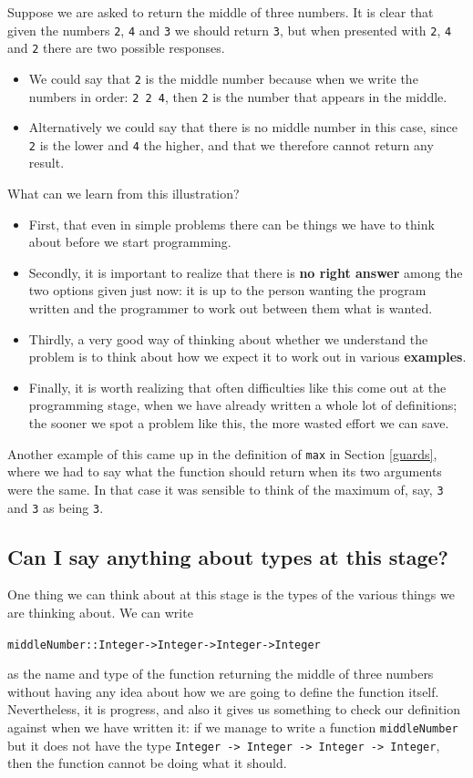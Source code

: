 Suppose we are asked to return the middle of three numbers. It is clear
that given the numbers \texttt{2}, \texttt{4} and
\texttt{3} we should return \texttt{3}, but when presented with \texttt{2}, \texttt{4} and
\texttt{2} there are two possible responses.
\begin{itemize}
\item\label{middleNumb}
We could say that \texttt{2}
is the middle number because when we write the numbers in order: \texttt{2 2 4}, 
then \texttt{2} 
is the number that appears in the middle.
\item
Alternatively we could say that there is no middle number in this case,
since \texttt{2} is the lower and \texttt{4} the higher,
and that we therefore cannot return any result.
\end{itemize}
What can we learn from this illustration? 
\begin{itemize}
\item
First, that even in simple
problems there can be things we have to think about before we start programming.
\item
Secondly, it is important to realize that there is \textbf{no right answer} among the two options 
given just now: it is up to the person wanting the program written and
the programmer to work out between them what is wanted. 
\item
Thirdly, a very
good way of thinking about whether we understand the problem is to think
about how we expect it to work out in various \textbf{examples}.
\item
Finally, it is worth realizing that often difficulties like this come
out at the programming stage, when we have already written a whole lot
of definitions; the sooner we spot a problem like this, the more wasted effort
we can save.
\end{itemize}
Another example of this came up in the definition of \texttt{max}
in Section \ref{guards}, where we had to say what the function should
return when its two arguments were the same. In that case it was
sensible to think of the maximum of, say, 
\texttt{3} and \texttt{3} as being \texttt{3}.

\subsection*{Can I say anything about types at this stage?}

One thing we can think about at this stage is the types of the various
things we are thinking about. We can write
\begin{alltt}
middleNumber :: Integer -> Integer -> Integer -> Integer 
\end{alltt}
as the name and type of the function returning the middle of three
numbers without having any idea about how we are going to define the
function itself. Nevertheless, it is progress, and also it gives us
something to check our definition against when we have written it: if we
manage to write a function \texttt{middleNumber} but it does not have
the type \texttt{Integer -> Integer -> Integer -> Integer}, then the function cannot be
doing what it should.


